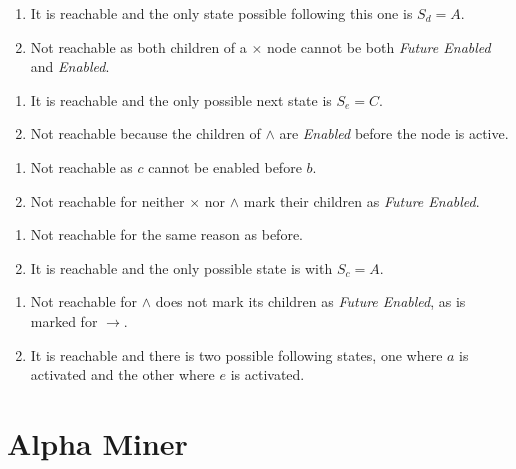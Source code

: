 \documentclass[a4paper]{report}
\begin{document}

\begin{enumerate}
    \item It is reachable and the only state possible following this one is $S_d=A$.
    \item Not reachable as both children of a $\times $ node cannot be both \emph{Future Enabled} and
	\emph{Enabled}.
\end{enumerate}


\begin{enumerate}
    \item It is reachable and the only possible next state is $S_e=C$.
    \item Not reachable because the children of $\wedge$ are \emph{Enabled} before the node is
	active. 
\end{enumerate}


\begin{enumerate}
    \item Not reachable as $ c$ cannot be enabled before $b$.
    \item Not reachable for neither $\times $ nor $ \wedge$ mark their children as
	\emph{Future Enabled}.
\end{enumerate}


\begin{enumerate}
    \item Not reachable for the same reason as before.
    \item It is reachable and the only possible state is with $S_c=A$.
\end{enumerate}


\begin{enumerate}
    \item Not reachable for $ \wedge$ does not mark its children as \emph{Future Enabled}, as
	is marked for $\to $.
    \item It is reachable and there is two possible following states, one where $a$ is
	activated and the other where $e$ is activated.
\end{enumerate}

\section*{Alpha Miner}
\end{document}
